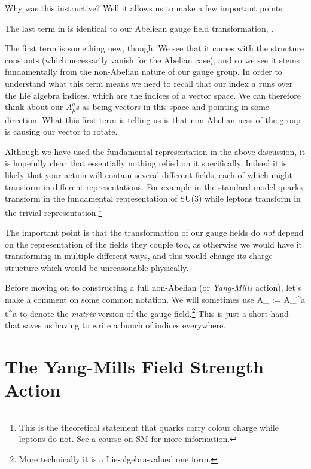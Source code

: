 Why was this instructive? Well it allows us to make a few important points:
\ben[label=(\roman*)]
    \item The last term in  is identical to our Abeliean gauge field transformation, . 
    \item The first term is something new, though. We see that it comes with the structure constants (which necessarily vanish for the Abelian case), and so we see it stems fundamentally from the non-Abelian nature of our gauge group. In order to understand what this term means we need to recall that our index $a$ runs over the Lie algebra indices, which are the indices of a vector space. We can therefore think about our $A_{\mu}^a$s as being vectors in this space and pointing in some direction. What this first term is telling us is that non-Abelian-ness of the group is causing our vector to rotate. 
    \item Although we have used the fundamental representation in the above discussion, it is hopefully clear that essentially nothing relied on it specifically. Indeed it is likely that your action will contain several different fields, each of which might transform in different representations. For example in the standard model quarks transform in the fundamental representation of SU(3) while leptons transform in the trivial representation.\footnote{This is the theoretical statement that quarks carry colour charge while leptons do not. See a course on SM for more information.} 
    
    The important point is that the transformation of our gauge fields do \textit{not} depend on the representation of the fields they couple too, as otherwise we would have it transforming in multiple different ways, and this would change its charge structure which would be unreasonable physically. 
\een 

\bnn 
    Before moving on to constructing a full non-Abelian (or \textit{Yang-Mills} action), let's make a comment on some common notation. We will sometimes use 
    \be 
    \label{eqn:AmuMatrixValued}
        A_{\mu} := A_{\mu}^a t^a
    \ee 
    to denote the \textit{matrix} version of the gauge field.\footnote{More technically it is a Lie-algebra-valued one form.} This is just a short hand that saves us having to write a bunch of indices everywhere.  
\enn 

\section{The Yang-Mills Field Strength Action}

